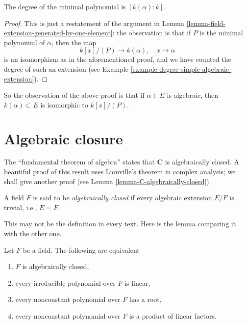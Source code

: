 \begin{lemma}
\label{lemma-degree-minimal-polynomial}
The degree of the minimal polynomial is $[k(\alpha) : k]$.
\end{lemma}

\begin{proof}
This is just a restatement of the argument in
Lemma \ref{lemma-field-extension-generated-by-one-element}: the observation
is that if $P$ is the minimal polynomial of $\alpha$, then the map
$$
k[x]/(P) \to k(\alpha), \quad x \mapsto \alpha
$$
is an isomorphism as in the aforementioned proof, and we have counted the
degree of such an extension (see
Example \ref{example-degree-simple-algebraic-extension}).
\end{proof}

\noindent
So the observation of the above proof is that if $\alpha \in E$ is algebraic,
then $k(\alpha) \subset E$ is isomorphic to $k[x]/(P)$.


\section{Algebraic closure}
\label{section-algebraic-closure}

\noindent
The ``fundamental theorem of algebra'' states that $\mathbf{C}$ is
algebraically closed. A beautiful proof of this result uses
Liouville's theorem in complex analysis; we shall give another
proof (see Lemma \ref{lemma-C-algebraically-closed}).

\begin{definition}
\label{definition-algebraically-closed}
A field $F$ is said to be {\it algebraically closed} if every algebraic
extension $E/F$ is trivial, i.e., $E = F$.
\end{definition}

\noindent
This may not be the definition in every text. Here is the lemma comparing
it with the other one.

\begin{lemma}
\label{lemma-algebraically-closed}
Let $F$ be a field. The following are equivalent
\begin{enumerate}
\item $F$ is algebraically closed,
\item every irreducible polynomial over $F$ is linear,
\item every nonconstant polynomial over $F$ has a root,
\item every nonconstant polynomial over $F$ is a product of linear factors.
\end{enumerate}
\end{lemma}

